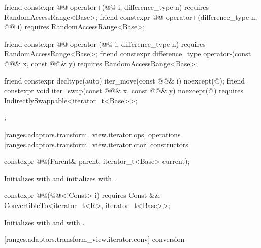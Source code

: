 \begin{codeblock}
{{{{{    friend constexpr @@ operator+(@@ i, difference_type n)
      requires RandomAccessRange<Base>;
    friend constexpr @@ operator+(difference_type n, @@ i)
      requires RandomAccessRange<Base>;

    friend constexpr @@ operator-(@@ i, difference_type n)
      requires RandomAccessRange<Base>;
    friend constexpr difference_type operator-(const @@& x, const @@& y)
      requires RandomAccessRange<Base>;

    friend constexpr decltype(auto) iter_move(const @@& i)
      noexcept(@\seebelow@);
    friend constexpr void iter_swap(const @@& x, const @@& y)
      noexcept(@\seebelow@) requires IndirectlySwappable<iterator_t<Base>>;
  };
}}}}
\end{codeblock}

[ranges.adaptors.transform_view.iterator.ops]{ operations}
[ranges.adaptors.transform_view.iterator.ctor]{ constructors}

\begin{itemdecl}
constexpr @@(Parent& parent, iterator_t<Base> current);
\end{itemdecl}

\begin{itemdescr}
\pnum
\effects Initializes  with  and
initializes  with .
\end{itemdescr}

%
\begin{itemdecl}
constexpr @@(@@<!Const> i)
requires Const && ConvertibleTo<iterator_t<R>, iterator_t<Base>>;
\end{itemdecl}

\begin{itemdescr}
\pnum
\effects Initializes  with  and 
with .
\end{itemdescr}

[ranges.adaptors.transform_view.iterator.conv]{ conversion}

